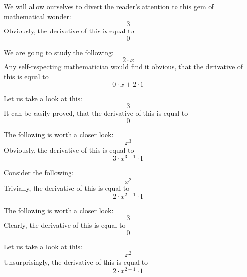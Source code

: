 \documentclass{article}
\begin{document}
We will allow ourselves to divert the reader's attention to this gem of mathematical wonder:
\begin{equation}
3 
\end{equation}
Obviously, the derivative of this is equal to
\begin{equation}
0 
\end{equation}

We are going to study the following:
\begin{equation}
2 \cdot x 
\end{equation}
Any self-respecting mathematician would find it obvious, that the derivative of this is equal to
\begin{equation}
0 \cdot x + 2 \cdot 1 
\end{equation}

Let us take a look at this:
\begin{equation}
3 
\end{equation}
It can be easily proved, that the derivative of this is equal to
\begin{equation}
0 
\end{equation}

The following is worth a closer look:
\begin{equation}
x ^{3 } 
\end{equation}
Obviously, the derivative of this is equal to
\begin{equation}
3 \cdot x ^{3 - 1 } \cdot 1 
\end{equation}

Consider the following:
\begin{equation}
x ^{2 } 
\end{equation}
Trivially, the derivative of this is equal to
\begin{equation}
2 \cdot x ^{2 - 1 } \cdot 1 
\end{equation}

The following is worth a closer look:
\begin{equation}
3 
\end{equation}
Clearly, the derivative of this is equal to
\begin{equation}
0 
\end{equation}

Let us take a look at this:
\begin{equation}
x ^{2 } 
\end{equation}
Unsurprisingly, the derivative of this is equal to
\begin{equation}
2 \cdot x ^{2 - 1 } \cdot 1 
\end{equation}
\end{document}
